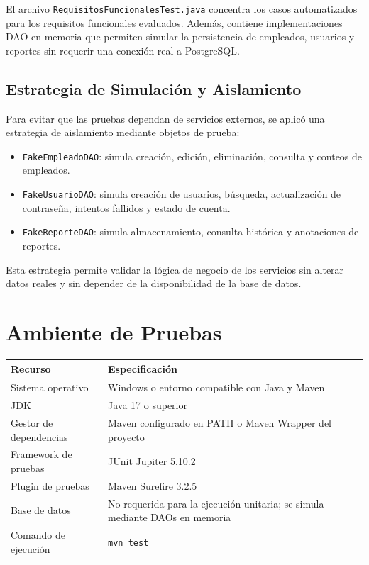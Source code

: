 \documentclass[12pt,a4paper]{article}
\begin{document}
El archivo \texttt{RequisitosFuncionalesTest.java} concentra los casos automatizados para los requisitos funcionales evaluados. Además, contiene implementaciones DAO en memoria que permiten simular la persistencia de empleados, usuarios y reportes sin requerir una conexión real a PostgreSQL.

\subsection{Estrategia de Simulación y Aislamiento}

Para evitar que las pruebas dependan de servicios externos, se aplicó una estrategia de aislamiento mediante objetos de prueba:

\begin{itemize}[leftmargin=*]
    \item \texttt{FakeEmpleadoDAO}: simula creación, edición, eliminación, consulta y conteos de empleados.
    \item \texttt{FakeUsuarioDAO}: simula creación de usuarios, búsqueda, actualización de contraseña, intentos fallidos y estado de cuenta.
    \item \texttt{FakeReporteDAO}: simula almacenamiento, consulta histórica y anotaciones de reportes.
\end{itemize}

Esta estrategia permite validar la lógica de negocio de los servicios sin alterar datos reales y sin depender de la disponibilidad de la base de datos.

\section{Ambiente de Pruebas}

\begin{longtable}{|p{5cm}|p{9cm}|}
\hline
\rowcolor{grisClaro}
\textbf{Recurso} & \textbf{Especificación} \\
\hline
Sistema operativo & Windows o entorno compatible con Java y Maven \\
\hline
JDK & Java 17 o superior \\
\hline
Gestor de dependencias & Maven configurado en PATH o Maven Wrapper del proyecto \\
\hline
Framework de pruebas & JUnit Jupiter 5.10.2 \\
\hline
Plugin de pruebas & Maven Surefire 3.2.5 \\
\hline
Base de datos & No requerida para la ejecución unitaria; se simula mediante DAOs en memoria \\
\hline
Comando de ejecución & \texttt{mvn test} \\
\hline
\end{longtable}
\end{document}
